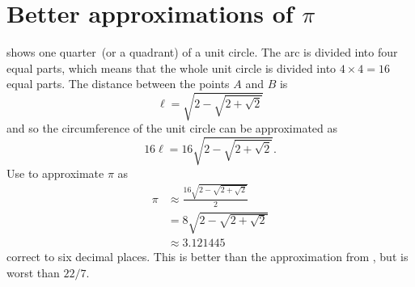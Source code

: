 \documentclass[a4paper,oneside,12pt]{article}
\begin{document}



\section{Better approximations of $\pi$}

 shows one
quarter~(or a quadrant) of a unit circle.  The arc is divided into
four equal parts, which means that the whole unit circle is divided
into $4 \times 4 = 16$ equal parts.  The distance between the points
$A$ and $B$ is
\[
\ell
=
\sqrt{
  2
  -
  \sqrt{2 + \sqrt{2}}
}
\]
and so the circumference of the unit circle can be approximated as
\[
16\ell
=
16
\sqrt{
  2
  -
  \sqrt{2 + \sqrt{2}}
}.
\]
Use  to approximate $\pi$
as
\begin{align*}
\pi
&\approx
\frac{
  16
  \sqrt{
    2
    -
    \sqrt{2 + \sqrt{2}}
  }
}{
  2
} \\[4pt]
&=
8
\sqrt{
  2
  -
  \sqrt{2 + \sqrt{2}}
} \\[4pt]
&\approx
3.121445
\end{align*}
correct to six decimal places.  This is better than the approximation
from , but is worst than
$22 / 7$.
\end{document}
